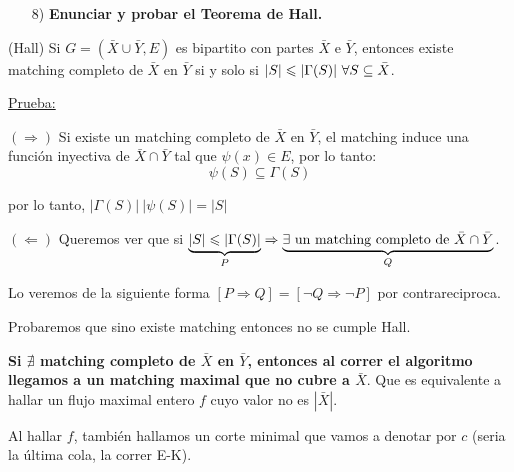\documentclass[12pt,a4paper]{article}
\begin{document}
\begin{itemize}
    \item [8)] \textbf{Enunciar y probar el Teorema de Hall.}
    \label{dem:hall}
\end{itemize}

\begin{teorema} (Hall) Si $G = (\bar{X} \cup \bar{Y}, E)$ es bipartito con partes 
    $\bar{X}$ e $\bar{Y}$, entonces existe matching completo de $\bar{X}$ en $\bar{Y}$
    si y solo si $|S| \leqslant |\Gamma(S)| \,\, \forall S \subseteq \bar{X}$.
\end{teorema}

\underline{Prueba:}
\medskip

$(\Rightarrow)$ Si existe un matching completo de $\bar{X}$ en $\bar{Y}$, el matching 
induce una función inyectiva de $\bar{X} \cap \bar{Y}$ tal que $\psi(x) \in E$, por lo tanto:
$$\psi(S) \subseteq \Gamma(S)$$

por lo tanto, $|\Gamma(S)| \> |\psi(S)| = |S|$
\medskip

$(\Leftarrow)$ Queremos ver que si $\underbrace{|S| \leqslant |\Gamma(S)|}_{P} \Rightarrow \underbrace{\exists\,\, \text{un matching completo de $\bar{X} \cap \bar{Y}$}}_{Q}$.
\medskip

Lo veremos de la siguiente forma $[P \Rightarrow Q] = [\neg Q \Rightarrow \neg P]$ 
por contrareciproca.
\medskip

Probaremos que sino existe matching entonces no se cumple Hall.
\medskip

\textbf{Si $\nexists$ matching completo de $\bar{X}$ en $\bar{Y}$, entonces al correr el 
algoritmo llegamos a un matching maximal que no cubre a $\bar{X}$}. Que es equivalente a 
hallar un flujo maximal entero $f$ cuyo valor no es $|\bar{X}|$.
\medskip

Al hallar $f$, también hallamos un corte minimal que vamos a denotar por $c$ (seria 
la última cola, la correr E-K).
\medskip
\end{document}
